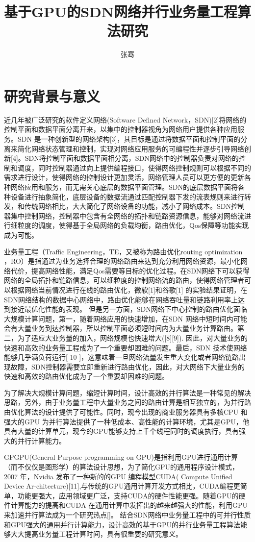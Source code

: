 \documentclass[master]{thesis-uestc}
\title{基于GPU的SDN网络并行业务量工程算法研究}
\author{张骞}
\begin{document}
\thesistableofcontents
\thesischapterexordium
\section{研究背景与意义}
近几年被广泛研究的软件定义网络(Software Defined Network，SDN)[2]将网络的控制平面和数据平面分离开来，以集中的控制器视角为网络用户提供各种应用服务。SDN 是一种创新型的网络架构[3]，其目标是通过将数据平面和控制平面的分离来简化网络状态管理和控制，实现对网络应用服务的可编程性并逐步引导网络创新[4]。SDN将控制平面和数据平面相分离，SDN网络中的控制器负责对网络的控制和调度，同时控制器通过向上提供编程接口，使得网络控制规则可以根据不同的需求进行设计，使得网络的控制设计更加灵活，网络管理人员可以更方便的更新各种网络应用和服务，而无需关心底层的数据平面管理。SDN的底层数据平面将各种设备进行抽象简化，底层设备的数据流通过匹配控制器下发的流表规则来进行转发，和传统网络相比，大大简化了网络设备的功能，减小了网络成本。SDN控制器集中控制网络，控制器中包含有全网络的拓扑和链路资源信息，能够对网络流进行细粒度的调度，使得基于全局网络的负载均衡，路由优化，Qos保障等功能实现成为可能。

业务量工程（Traffic Engineering，TE，又被称为路由优化routing optimization ，RO）是指通过为业务选择合理的网络路由来达到充分利用网络资源，最小化网络代价，提高网络性能，满足Qos需要等目标的优化过程。在SDN网络下可以获得网络的全局拓扑和链路信息，可以细粒度的控制网络流的路由，使得网络管理者可以根据网络当前情况进行在线的路由优化，微软[1]和谷歌[1] 的实验结果证明，在SDN网络结构的数据中心网络中，路由优化能够在网络吞吐量和链路利用率上达到接近最优化性能的表现。
但是另一方面，SDN网络下中心控制的路由优化面临大规模计算问题，第一，随着网络应用的快速增加，在SDN 网络中短时间内可能会有大量业务到达控制器，所以控制平面必须短时间内为大量业务计算路由。第二，为了适应大业务量的加入，网络规模也快速增大([8][9]). 因此，对大量业务的快速和高效的业务量工程成为了一个重要却困难的问题。最后，SDN 技术使网络能够几乎满负荷运行[ 10 ]，这意味着一旦网络流量发生重大变化或者网络链路出现故障，SDN控制器需要立即重新进行路由优化，因此，对大网络下大量业务的快速和高效的路由优化成为了一个重要却困难的问题。

为了解决大规模计算问题，缩短计算时间，设计高效的并行算法是一种常见的解决思路，另外，由于业务量工程中大量业务之间的路由计算是相互独立的，为并行路由优化算法的设计提供了可能性。同时，现今出现的商业服务器具有多核CPU 和强大的GPU 为并行算法提供了一种低成本、高性能的计算环境，尤其是GPU，他具有大量的计算单元，现今的GPU能够支持上千个线程同时的调度执行，具有强大的并行计算能力。

GPGPU(General Purpose programming on GPU)是指利用GPU进行通用计算（而不仅仅是图形学）的算法设计思想，为了简化GPU的通用程序设计模式，2007 年，Nvidia 发布了一种新的的GPU 编程模型CUDA( Compute Unified Device Ar-chitecture)[11],与传统的GPU通用计算开发方式相比，CUDA编程更简单，功能更强大，应用领域更广泛，支持CUDA的硬件性能更强。随着GPU的硬件计算能力的提高和CUDA 在通用计算中发挥出的越来越强大的性能，利用GPU来加速并行算法成为一个研究热点[]。
结合SDN网络中业务量工程中的可并行性质和GPU强大的通用并行计算能力，设计高效的基于GPU的并行业务量工程算法能够大大提高业务量工程计算时间，具有很重要的研究意义。
\end{document}
